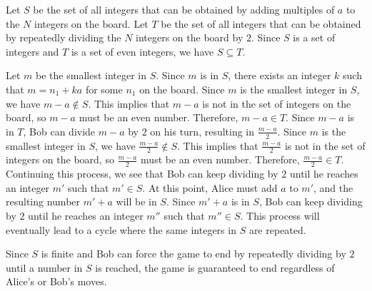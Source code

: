 Let $S$ be the set of all integers that can be obtained by adding multiples of $a$ to the $N$ integers on the board.
Let $T$ be the set of all integers that can be obtained by repeatedly dividing the $N$ integers on the board by $2$.
Since $S$ is a set of integers and $T$ is a set of even integers, we have $S \subseteq T$.

Let $m$ be the smallest integer in $S$.
Since $m$ is in $S$, there exists an integer $k$ such that $m = n_1 + ka$ for some $n_1$ on the board.
Since $m$ is the smallest integer in $S$, we have $m - a \notin S$.
This implies that $m - a$ is not in the set of integers on the board, so $m - a$ must be an even number.
Therefore, $m - a \in T$.
Since $m - a$ is in $T$, Bob can divide $m - a$ by $2$ on his turn, resulting in $\frac{m - a}{2}$.
Since $m$ is the smallest integer in $S$, we have $\frac{m - a}{2} \notin S$.
This implies that $\frac{m - a}{2}$ is not in the set of integers on the board, so $\frac{m - a}{2}$ must be an even number.
Therefore, $\frac{m - a}{2} \in T$.
Continuing this process, we see that Bob can keep dividing by $2$ until he reaches an integer $m'$ such that $m' \in S$.
At this point, Alice must add $a$ to $m'$, and the resulting number $m' + a$ will be in $S$.
Since $m' + a$ is in $S$, Bob can keep dividing by $2$ until he reaches an integer $m''$ such that $m'' \in S$.
This process will eventually lead to a cycle where the same integers in $S$ are repeated.

Since $S$ is finite and Bob can force the game to end by repeatedly dividing by $2$ until a number in $S$ is reached, the game is guaranteed to end regardless of Alice's or Bob's moves.
